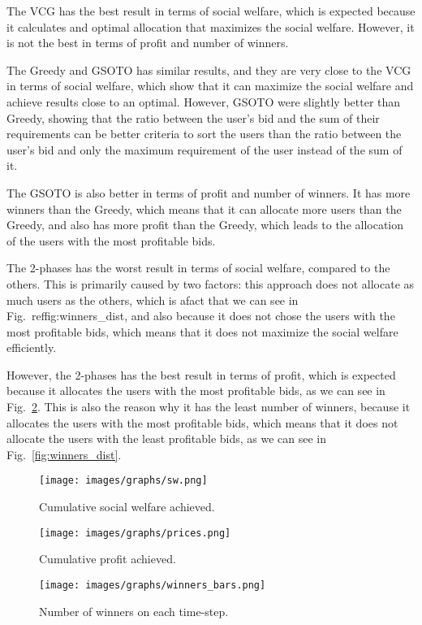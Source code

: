 \documentclass[English]{ic-tese-v3}
\begin{document}
The VCG has the best result in terms of social welfare, which is expected because it calculates and optimal allocation that maximizes the social welfare. However, it is not the best in terms of profit and number of winners.

The Greedy and GSOTO has similar results, and they are very close to the VCG in terms of social welfare, which show that it can maximize the social welfare and achieve results close to an optimal. However, GSOTO were slightly better than Greedy, showing that the ratio between the user's bid and the sum of their requirements can be better criteria to sort the users than the ratio between the user's bid and only the maximum requirement of the user instead of the sum of it.

The GSOTO is also better in terms of profit and number of winners. It has more winners than the Greedy, which means that it can allocate more users than the Greedy, and also has more profit than the Greedy, which leads to the allocation of the users with the most profitable bids.

The 2-phases has the worst result in terms of social welfare, compared to the others. This is primarily caused by two factors: this approach does not allocate as much users as the others, which is afact that we can see in Fig.~ref{fig:winners_dist}, and also because it does not chose the users with the most profitable bids, which means that it does not maximize the social welfare efficiently.

However, the 2-phases has the best result in terms of profit, which is expected because it allocates the users with the most profitable bids, as we can see in Fig.~\ref{fig:profit}. This is also the reason why it has the least number of winners, because it allocates the users with the most profitable bids, which means that it does not allocate the users with the least profitable bids, as we can see in Fig.~\ref{fig:winners_dist}.
\begin{figure}
    \centering
    \texttt{[image: images/graphs/sw.png]}
    \caption{Cumulative social welfare achieved.}
    \label{fig:sw}
\end{figure}

\begin{figure}
    \centering
    \texttt{[image: images/graphs/prices.png]}
    \caption{Cumulative profit achieved.}
    \label{fig:profit}
\end{figure}

\begin{figure}
    \centering
    \texttt{[image: images/graphs/winners\_bars.png]}
    \caption{Number of winners on each time-step.}
    \label{fig:winners}
\end{figure}
\end{document}
